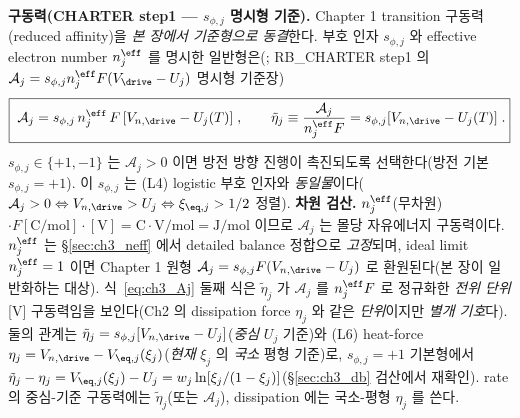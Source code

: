 \textbf{구동력(CHARTER step1 — $s_{\phi,j}$ 명시형 기준).} Chapter 1 transition 구동력(reduced affinity)을
\emph{본 장에서 기준형으로 동결}한다. 부호 인자 $s_{\phi,j}$ 와 effective electron number $n_j^{\eff}$ 를 명시한
일반형은(; RB\_CHARTER step1 의 $\mathcal A_j=s_{\phi,j}n_j^\eff F(V_\drive-U_j)$ 명시형 기준장)
\begin{equation}
\boxed{\;\mathcal A_j=s_{\phi,j}\,n_j^{\eff}\,F\,[V_{n,\drive}-U_j(T)]\;,\qquad \tilde\eta_j\equiv\frac{\mathcal A_j}{n_j^{\eff}F}=s_{\phi,j}[V_{n,\drive}-U_j(T)]\;.}
\label{eq:ch3_Aj}
\end{equation}
$s_{\phi,j}\in\{+1,-1\}$ 는 $\mathcal A_j>0$ 이면 방전 방향 진행이 촉진되도록 선택한다(방전 기본 $s_{\phi,j}=+1$). 이
$s_{\phi,j}$ 는 (L4) logistic 부호 인자와 \emph{동일물}이다($\mathcal A_j>0\Leftrightarrow V_{n,\drive}>U_j\Leftrightarrow\xi_{\eq,j}>1/2$ 정렬).
\textbf{차원 검산.} $n_j^{\eff}$(무차원)$\cdot F[\mathrm{C/mol}]\cdot[\mathrm V]=\mathrm{C\cdot V/mol}=\mathrm{J/mol}$
이므로 $\mathcal A_j$ 는 몰당 자유에너지 구동력이다. $n_j^{\eff}$ 는 \S\ref{sec:ch3_neff} 에서 detailed balance
정합으로 \emph{고정}되며, ideal limit $n_j^{\eff}=1$ 이면 Chapter 1 원형 $\mathcal A_j=s_{\phi,j}F(V_{n,\drive}-U_j)$
로 환원된다(본 장이 일반화하는 대상). 식~\eqref{eq:ch3_Aj} 둘째 식은 $\tilde\eta_j$ 가 $\mathcal A_j$ 를 $n_j^\eff F$
로 정규화한 \emph{전위 단위}[V] 구동력임을 보인다(Ch2 의 dissipation force $\eta_j$ 와 같은 \emph{단위}이지만 \emph{별개
기호}다). 둘의 관계는 $\tilde\eta_j=s_{\phi,j}[V_{n,\drive}-U_j]$(\emph{중심} $U_j$ 기준)와 (L6) heat-force
$\eta_j=V_{n,\drive}-V_{\eq,j}(\xi_j)$(\emph{현재} $\xi_j$ 의 \emph{국소} 평형 기준)로, $s_{\phi,j}=+1$ 기본형에서
$\tilde\eta_j-\eta_j=V_{\eq,j}(\xi_j)-U_j=w_j\ln[\xi_j/(1-\xi_j)]$(\S\ref{sec:ch3_db} 검산에서 재확인). rate 의
중심-기준 구동력에는 $\tilde\eta_j$(또는 $\mathcal A_j$), dissipation 에는 국소-평형 $\eta_j$ 를 쓴다.

